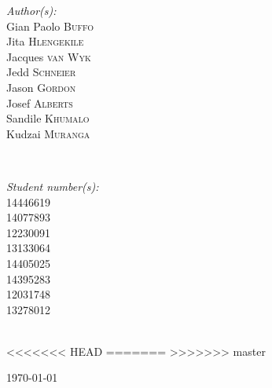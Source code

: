 \documentclass[a4paper,12pt]{article}
\begin{document}
\begin{titlepage}
\begin{minipage}{0.4\textwidth}
\begin{flushleft} \large
\emph{Author(s):}\\
Gian Paolo \textsc{Buffo}\\ %
Jita \textsc{Hlengekile}\\
Jacques \textsc{van Wyk}\\
Jedd \textsc{Schneier}\\
Jason \textsc{Gordon}\\
Josef \textsc{Alberts}\\
Sandile \textsc{Khumalo}\\
Kudzai \textsc{Muranga}
\end{flushleft}
\end{minipage}
~
\begin{minipage}{0.4\textwidth}
\begin{flushright} \large
\emph{Student number(s):} \\
14446619\\ %
14077893\\
12230091\\
13133064\\
14405025\\
14395283 \\
12031748\\
13278012
\end{flushright}
\end{minipage}\\[4cm]


<<<<<<< HEAD
=======
>>>>>>> master

{\large \today}\\[3cm] %

 

\vfill %

\end{titlepage}

\newpage

\end{document}

